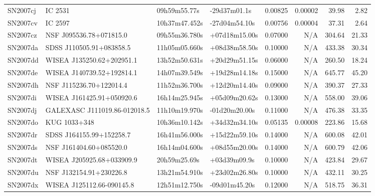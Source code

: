 \begin{longtable}{llllrrrr}
SN2007cj         &                         IC 2531 &    09h59m55.77s &    -29d37m01.1s &  0.00825 &  0.00002 &    39.98 &        2.82 \\
SN2007cv         &                         IC 2597 &   10h37m47.452s &   -27d04m54.10s &  0.00756 &  0.00004 &    37.31 &        2.64 \\
SN2007cz         &         NSF J095536.78+071815.0 &   09h55m36.780s &   +07d18m15.00s &  0.07000 &      N/A &   304.64 &       21.33 \\
SN2007da         &        SDSS J110505.91+083858.5 &   11h05m05.660s &   +08d38m58.50s &  0.10000 &      N/A &   433.38 &       30.34 \\
SN2007dd         &       WISEA J135250.62+202951.1 &   13h52m50.631s &   +20d29m51.15s &  0.06000 &      N/A &   260.50 &       18.24 \\
SN2007de         &       WISEA J140739.52+192814.1 &   14h07m39.549s &   +19d28m14.18s &  0.15000 &      N/A &   645.77 &       45.20 \\
SN2007dh         &         NSF J115236.70+122014.4 &   11h52m36.700s &   +12d20m14.40s &  0.09000 &      N/A &   390.37 &       27.33 \\
SN2007di         &       WISEA J161425.91+050920.6 &   16h14m25.945s &   +05d09m20.62s &  0.13000 &      N/A &   558.00 &       39.06 \\
SN2007dj         &  GALEXASC J111019.86-012018.5   &   11h10m19.970s &   -01d20m20.00s &  0.11000 &      N/A &   476.38 &       33.35 \\
SN2007do         &                    KUG 1033+348 &   10h36m10.142s &   +34d32m34.10s &  0.05135 &  0.00008 &   223.86 &       15.68 \\
SN2007dr         &        SDSS J164155.99+152258.7 &   16h41m56.000s &   +15d22m59.10s &  0.14000 &      N/A &   600.08 &       42.01 \\
SN2007ds         &         NSF J161404.60+085520.0 &   16h14m04.600s &   +08d55m20.00s &  0.14000 &      N/A &   600.79 &       42.06 \\
SN2007dt         &       WISEA J205925.68+033909.9 &    20h59m25.69s &    +03d39m09.9s &  0.10000 &      N/A &   423.84 &       29.67 \\
SN2007du         &         NSF J132154.91+230226.8 &   13h21m54.910s &   +23d02m26.80s &  0.10000 &      N/A &   432.11 &       30.25 \\
SN2007dx         &       WISEA J125112.66-090145.8 &   12h51m12.750s &   -09d01m45.20s &  0.12000 &      N/A &   518.75 &       36.31 \\

\end{longtable}

